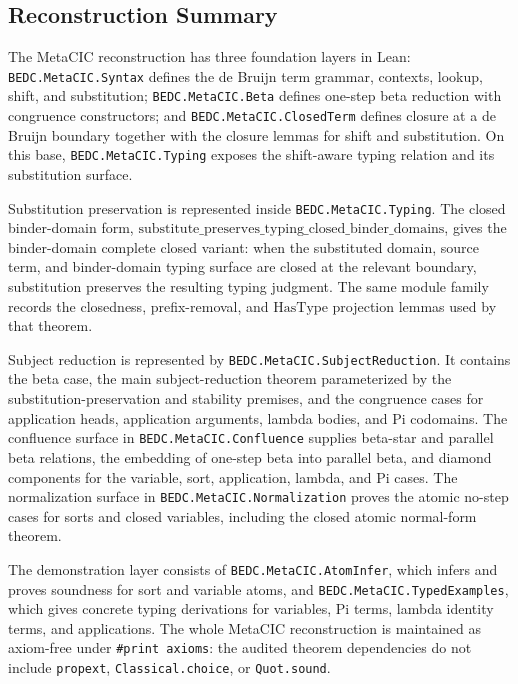 \subsection{Reconstruction Summary}\label{subsec:reconstruction-summary}

The MetaCIC reconstruction has three foundation layers in Lean:
\texttt{BEDC.MetaCIC.Syntax} defines the de Bruijn term grammar, contexts,
lookup, shift, and substitution; \texttt{BEDC.MetaCIC.Beta} defines
one-step beta reduction with congruence constructors; and
\texttt{BEDC.MetaCIC.ClosedTerm} defines closure at a de Bruijn boundary
together with the closure lemmas for shift and substitution. On this base,
\texttt{BEDC.MetaCIC.Typing} exposes the shift-aware typing relation and its
substitution surface.

Substitution preservation is represented inside
\texttt{BEDC.MetaCIC.Typing}. The closed binder-domain form,
$\mathrm{substitute\_preserves\_typing\_closed\_binder\_domains}$,
gives the binder-domain complete closed variant: when the substituted
domain, source term, and binder-domain typing surface are closed at the
relevant boundary, substitution preserves the resulting typing judgment.
The same module family records the closedness, prefix-removal, and
$\mathrm{HasType}$ projection lemmas used by that theorem.

Subject reduction is represented by
\texttt{BEDC.MetaCIC.SubjectReduction}. It contains the beta case, the main
subject-reduction theorem parameterized by the substitution-preservation and
stability premises, and the congruence cases for application heads,
application arguments, lambda bodies, and Pi codomains. The confluence
surface in \texttt{BEDC.MetaCIC.Confluence} supplies beta-star and parallel
beta relations, the embedding of one-step beta into parallel beta, and
diamond components for the variable, sort, application, lambda, and Pi
cases. The normalization surface in
\texttt{BEDC.MetaCIC.Normalization} proves the atomic no-step cases for
sorts and closed variables, including the closed atomic normal-form theorem.

The demonstration layer consists of \texttt{BEDC.MetaCIC.AtomInfer}, which
infers and proves soundness for sort and variable atoms, and
\texttt{BEDC.MetaCIC.TypedExamples}, which gives concrete typing derivations
for variables, Pi terms, lambda identity terms, and applications. The whole
MetaCIC reconstruction is maintained as axiom-free under
\texttt{\#print axioms}: the audited theorem dependencies do not include
\texttt{propext}, \texttt{Classical.choice}, or \texttt{Quot.sound}.
